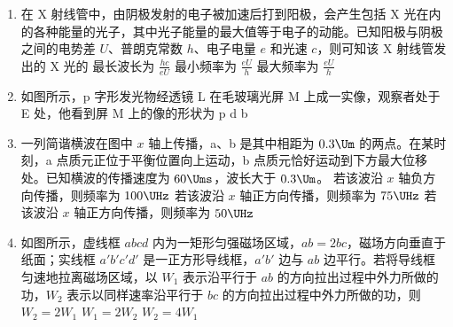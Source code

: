 \documentclass[\gkver]{gaokaozhenti}
\begin{document}
\begin{enumerate}
\item
在 X 射线管中，由阴极发射的电子被加速后打到阳极，会产生包括 X 光在内的各种能量的光子，其中光子能量的最大值等于电子的动能。已知阳极与阴极之间的电势差 $U$、普朗克常数 $h$、电子电量 $e$ 和光速 $c$，则可知该 X 射线管发出的 X 光的
{最长波长为 $\frac{hc}{eU}$}
{最小频率为 $\frac{eU}{h}$}
{最大频率为 $\frac{eU}{h}$}

\item
如图所示，p 字形发光物经透镜 L 在毛玻璃光屏 M 上成一实像，观察者处于 E 处，他看到屏 M 上的像的形状为
{p}
{d}
{b}

\item
一列简谐横波在图中 $x$ 轴上传播，a、b 是其中相距为 $0.3\Um$ 的两点。在某时刻，a 点质元正位于平衡位置向上运动，b 点质元恰好运动到下方最大位移处。已知横波的传播速度为 $60\Ums$，波长大于 $0.3\Um$。
\onepicture[w=7.50cm]{}
{若该波沿 $x$ 轴负方向传播，则频率为 $100\UHz$}
{若该波沿 $x$ 轴正方向传播，则频率为 $75\UHz$}
{若该波沿 $x$ 轴正方向传播，则频率为 $50\UHz$}

\item
如图所示，虚线框 $abcd$ 内为一矩形匀强磁场区域，$ab=2bc$，磁场方向垂直于纸面；实线框 $a'b'c'd'$ 是一正方形导线框，$a'b'$ 边与 $ab$ 边平行。若将导线框匀速地拉离磁场区域，以 $W_{1}$ 表示沿平行于 $ab$ 的方向拉出过程中外力所做的功，$W_{2}$ 表示以同样速率沿平行于 $bc$ 的方向拉出过程中外力所做的功，则
{$W_{2} = 2W_{1}$}
{$W_{1} = 2W_{2}$}
{$W_{2} = 4W_{1}$}
\end{enumerate}
\end{document}
